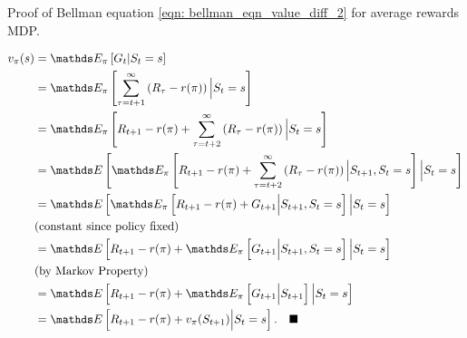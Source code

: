 \documentclass[11pt]{article}
\begin{document}
\newpage
\begin{exercise} Proof of Bellman equation \eqref{eqn: bellman_eqn_value_diff_2} for average rewards MDP. 
\end{exercise}
\begin{solution}
\begin{align*}
v_{\pi}(s) &=\E{\pi}{G_{t}|S_{t}=s}\\
&= \E{\pi}{\sum_{\tau=t+1}^{\infty}\paren{R_{\tau} - r(\pi)} \Big| S_{t}=s} \\
&=  \E{\pi}{R_{t+1} - r(\pi) + \sum_{\tau=t+2}^{\infty}\paren{R_{\tau} - r(\pi)} \Big| S_{t}=s} \\
&= \E{}{\E{\pi}{R_{t+1} - r(\pi) + \sum_{\tau=t+2}^{\infty}\paren{R_{\tau} - r(\pi)} \Big| S_{t+1}, S_{t}=s}\Big| S_{t}=s}\\
&= \E{}{\E{\pi}{R_{t+1} - r(\pi) + G_{t+1} \Big| S_{t+1}, S_{t}=s}\Big| S_{t}=s}\\
&(\text{constant since policy fixed})\\
&= \E{}{R_{t+1} - r(\pi) + \E{\pi}{G_{t+1} \Big| S_{t+1}, S_{t}=s}\Big|  S_{t}=s}\\
&(\text{by Markov Property})\\
&= \E{}{R_{t+1} - r(\pi) + \E{\pi}{G_{t+1} \Big| S_{t+1}}\Big|  S_{t}=s}\\
&=  \E{}{R_{t+1} - r(\pi) + v_{\pi}(S_{t+1})\Big|  S_{t}=s}. \quad \QEDA
\end{align*} 
\end{solution}
\end{document}
